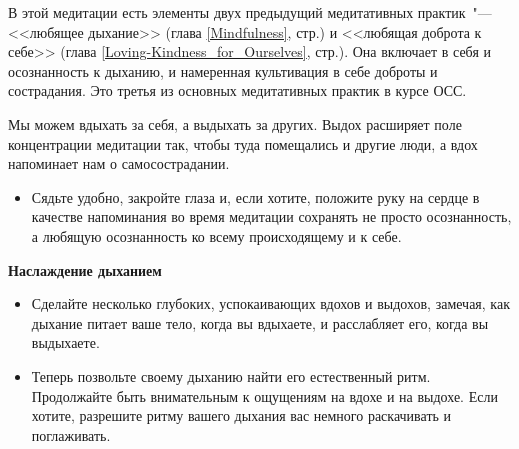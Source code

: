  \label{M:Giving_and_Receiving_Compassion}

В этой медитации есть элементы двух предыдущий медитативных практик~"--- <<любящее дыхание>> (глава \ref{Mindfulness}, стр.\:\pageref{medit:Affectionate_Breathing}) и <<любящая доброта к себе>> (глава \ref{Loving-Kindness_for_Ourselves}, стр.\:\pageref{M:Loving-Kindness_for_Ourselves}). Она включает в себя и осознанность к дыханию, и намеренная культивация в себе доброты и сострадания. Это третья из основных медитативных практик в курсе ОСС.

Мы можем вдыхать за себя, а выдыхать за других. Выдох расширяет поле концентрации медитации так, чтобы туда помещались и другие люди, а вдох напоминает нам о самосострадании.

\vspace{2ex}

\begin{itemize}
	\item Сядьте удобно, закройте глаза и, если хотите, положите руку на сердце в качестве напоминания во время медитации сохранять не просто осознанность, а любящую осознанность ко всему происходящему и к себе.
\end{itemize}

\vspace{2ex}

{\large \textbf{Наслаждение дыханием}}
\begin{itemize}
	\item Сделайте несколько глубоких, успокаивающих вдохов и выдохов, замечая, как дыхание питает ваше тело, когда вы вдыхаете, и расслабляет его, когда вы выдыхаете.
	\item Теперь позвольте своему дыханию найти его естественный ритм. Продолжайте быть внимательным к ощущениям на вдохе и на выдохе. Если хотите, разрешите ритму вашего дыхания вас немного раскачивать и поглаживать.
\end{itemize}
 
\vspace{2ex}
 
